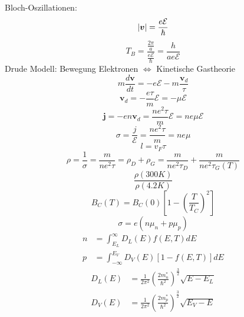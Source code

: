 \documentclass[11pt]{article}
\DeclarePairedDelimiter\abs{\lvert}{\rvert}
\begin{document}
Bloch-Oszillationen:
\begin{equation}
  \abs{\bm{v}}=\frac{e\mathcal{E}}{\hbar}
\end{equation}
\begin{equation}
  T_B=\frac{\frac{2\pi}{a}}{\frac{e\mathcal{E}}{\hbar}}=\frac{h}{ae\mathcal{E}}
\end{equation}
Drude Modell: Bewegung Elektronen $\iff$ Kinetische Gastheorie
\begin{equation}
  m\frac{d\bm{v}}{dt}=-e\mathcal{E}-m\frac{\bm{v}_d}{\tau}
\end{equation}
\begin{equation}
  \bm{v}_d=-\frac{e\tau}{m}\bm{\mathcal{E}}=-\mu\bm{\mathcal{E}}
\end{equation}
\begin{equation}
  \bm{j}=-en\bm{v}_d=\frac{ne^2\tau}{m}\bm{\mathcal{E}}=ne\mu\bm{\mathcal{E}}
\end{equation}
\begin{equation}
  \sigma=\frac{j}{\mathcal{E}}=\frac{ne^2\tau}{m}=ne\mu
\end{equation}
\begin{equation}
  l=v_F\tau
\end{equation}
\begin{equation}
  \rho=\frac{1}{\sigma}=\frac{m}{ne^2\tau}=\rho_D+\rho_G=\frac{m}{ne^2\tau_D}+
  \frac{m}{ne^2\tau_G(T)}
\end{equation}
\begin{equation}
  \frac{\rho(300K)}{\rho(4.2K)}
\end{equation}
\begin{equation}
  B_C(T)=B_C(0)\left[1-\left(\frac{T}{T_C}\right)^2\right]
\end{equation}
\begin{equation}
  \sigma=e(n\mu_n+p\mu_p)
\end{equation}
\begin{equation}
  \begin{align}
    n&=\int_{E_L}^{\infty}D_L(E)f(E,T)dE\\
    p&=\int_{-\infty}^{E_V}D_V(E)[1-f(E,T)]dE
  \end{align}
\end{equation}
\begin{equation}
  \begin{align}
    D_L(E)&=\frac{1}{2\pi^2}\left(\frac{2m_n^*}{\hbar^2}\right)^{\frac{3}{2}}
    \sqrt{E-E_L}\\
    D_V(E)&=\frac{1}{2\pi^2}\left(\frac{2m_p^*}{\hbar^2}\right)^{\frac{3}{2}}
    \sqrt{E_V-E}
  \end{align}
\end{equation}
\end{document}
